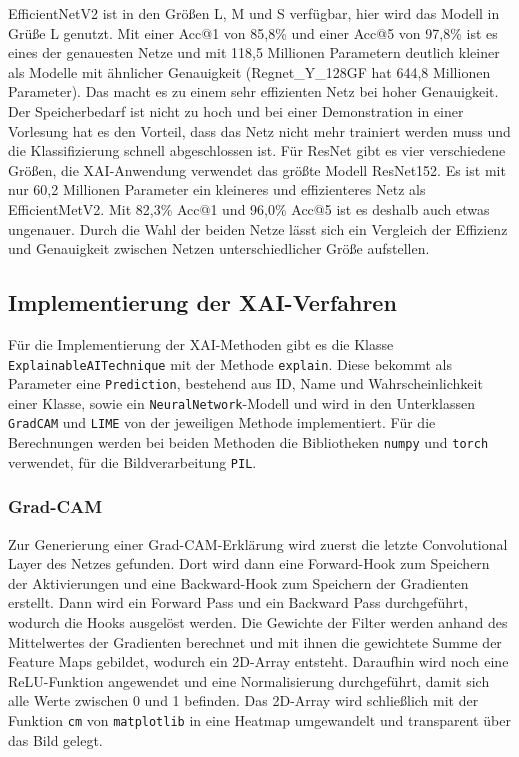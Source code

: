 EfficientNetV2 ist in den Größen L, M und S verfügbar, hier wird das Modell in Grüße L genutzt.
Mit einer Acc@1 von 85,8\% und einer Acc@5 von 97,8\% ist es eines der genauesten Netze und mit 118,5 Millionen Parametern deutlich kleiner als Modelle mit ähnlicher Genauigkeit (Regnet\_Y\_128GF hat 644,8 Millionen Parameter).
Das macht es zu einem sehr effizienten Netz bei hoher Genauigkeit.
Der Speicherbedarf ist nicht zu hoch und bei einer Demonstration in einer Vorlesung hat es den Vorteil, dass das Netz nicht mehr trainiert werden muss und die Klassifizierung schnell abgeschlossen ist.
Für ResNet gibt es vier verschiedene Größen, die XAI-Anwendung verwendet das größte Modell ResNet152.
Es ist mit nur 60,2 Millionen Parameter ein kleineres und effizienteres Netz als EfficientMetV2.
Mit 82,3\% Acc@1 und 96,0\% Acc@5 ist es deshalb auch etwas ungenauer.
\cite{torchvision_models}
Durch die Wahl der beiden Netze lässt sich ein Vergleich der Effizienz und Genauigkeit zwischen Netzen unterschiedlicher Größe aufstellen.

\subsection{Implementierung der XAI-Verfahren}
Für die Implementierung der XAI-Methoden gibt es die Klasse \verb|ExplainableAITechnique| mit der Methode \verb|explain|.
Diese bekommt als Parameter eine \verb|Prediction|, bestehend aus ID, Name und Wahrscheinlichkeit einer Klasse, sowie ein \verb|NeuralNetwork|-Modell und wird in den Unterklassen \verb|GradCAM| und \verb|LIME| von der jeweiligen Methode implementiert.
Für die Berechnungen werden bei beiden Methoden die Bibliotheken \verb|numpy| und \verb|torch| verwendet, für die Bildverarbeitung \verb|PIL|.

\subsubsection{Grad-CAM}
Zur Generierung einer Grad-CAM-Erklärung wird zuerst die letzte Convolutional Layer des Netzes gefunden.
Dort wird dann eine Forward-Hook zum Speichern der Aktivierungen und eine Backward-Hook zum Speichern der Gradienten erstellt.
Dann wird ein Forward Pass und ein Backward Pass durchgeführt, wodurch die Hooks ausgelöst werden.
Die Gewichte der Filter werden anhand des Mittelwertes der Gradienten berechnet und mit ihnen die gewichtete Summe der Feature Maps gebildet, wodurch ein 2D-Array entsteht.
Daraufhin wird noch eine ReLU-Funktion angewendet und eine Normalisierung durchgeführt, damit sich alle Werte zwischen 0 und 1 befinden.
Das 2D-Array wird schließlich mit der Funktion \verb|cm| von \verb|matplotlib| in eine Heatmap umgewandelt und transparent über das Bild gelegt.


